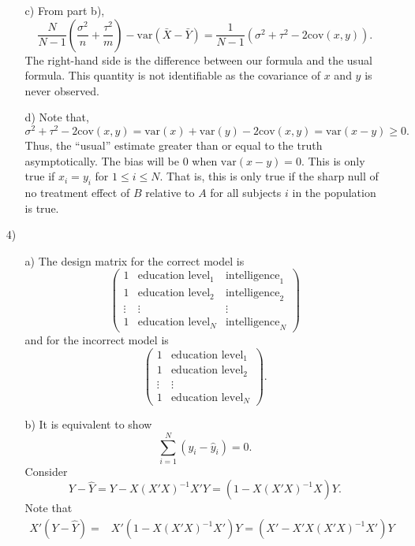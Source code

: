 \documentclass{article}
\newcommand{\var}[0]{\text{var}}
\newcommand{\cov}[0]{\text{cov}}
\begin{document}
\begin{itemize}
\begin{itemize}
   \item[c)]
     From part b),
       $$
	\frac N {N-1}\left(\frac{\sigma^2}{n}+ \frac{\tau^2}{m}\right) - 
	\var(\bar X - \bar Y) = \frac{1}{N-1}(\sigma^2 + \tau^2 - 2\cov(x,y)).
       $$
     The right-hand side is the difference between our formula and the usual formula.  
     This quantity is not identifiable as the covariance of $x$ and $y$ is never observed.
   \item[d)]
     Note that,
       $$
         \sigma^2 + \tau^2 - 2\cov(x,y) = \var(x) + \var(y) - 2\cov(x,y) = \var(x-y) \geq 0.
       $$
     Thus, the ``usual'' estimate greater than or equal to the truth asymptotically.  
     The bias will be 0 when $\var(x-y) = 0$.  
     This is only true if $x_i = y_i$ for $1\leq i \leq N$.  
     That is, this is only true if the sharp null of no treatment effect of $B$ relative to $A$
     for all subjects $i$ in the population is true.
  \end{itemize}
  \item[4)]
  \begin{itemize}
    \item[a)]The design matrix for the correct model is
      $$
        \left(
          \begin{array}{ccc} 
            1 & \text{education level}_1 & \text{intelligence}_1 \\
            1 & \text{education level}_2 & \text{intelligence}_2 \\
            \vdots & \vdots & \vdots \\
            1 & \text{education level}_N & \text{intelligence}_N 
          \end{array}
        \right)
      $$
      and for the incorrect model is
      $$
        \left (
          \begin{array}{cc}
            1 & \text{education level}_1  \\
            1 & \text{education level}_2  \\
            \vdots & \vdots  \\
            1 & \text{education level}_N 
          \end{array}
        \right ).
      $$
    \item[b)]
      \label{partb}
      It is equivalent to show
      $$
        \sum_{i=1}^N (y_i - \hat y_i) = 0.
      $$
      Consider 
      $$
        Y - \hat Y = Y - X(X'X)^{-1}X'Y = (1 - X(X'X)^{-1}X)Y.
      $$
      Note that 
      \begin{align*}
        X'(Y - \hat Y) = & X'(1 - X(X'X)^{-1}X')Y = (X' - X'X(X'X)^{-1}X')Y \\

\end{align*}
\end{itemize}
\end{itemize}
\end{document}
